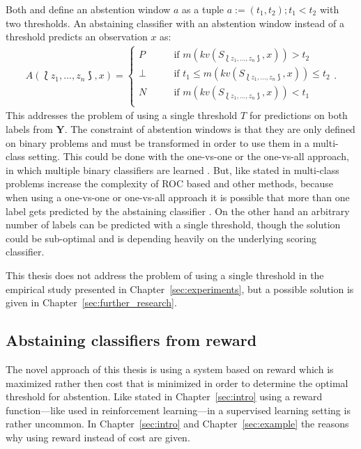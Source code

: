 \documentclass[twoside,11pt]{article}
\def\ds{\Lbag z_1,\dots,z_n \Rbag}
\def\Y{\textbf{Y}}
\begin{document}
Both \citet{friedel_et_al_2006} and \citet{guan_et_al_2018}
define an abstention window $a$ as a tuple
$a := (t_1, t_2); t_1 < t_2$ with two thresholds.
An abstaining classifier with an abstention window
instead of a threshold predicts an observation $x$ as:
\begin{align*}
  A(\ds, x) =
    \begin{cases}
      P    &\qquad \text{if } m(kv(S_{\ds}, x)) > t_2 \\
      \bot &\qquad \text{if }
            t_1 \leq m(kv(S_{\ds}, x)) \leq t_2 \\
      N    &\qquad \text{if } m(kv(S_{\ds}, x)) < t_1 \\
    \end{cases}.
\end{align*}
This addresses the problem of using a single threshold $T$
for predictions on both labels from $\Y$.
The constraint of abstention windows is that they are only
defined on binary problems and must be transformed in order
to use them in a multi-class setting.
This could be done with the one-vs-one or the one-vs-all
approach, in which multiple binary classifiers are learned
\citep[see e.g.][Chapter 14.5]{murphy_2012}.
But, like stated in \citet{friedel_2005} multi-class
problems increase the complexity of ROC based and other
methods, because when using a one-vs-one or one-vs-all
approach it is possible that more than one label gets
predicted by the abstaining classifier
\citep[see][]{friedel_2005}.
On the other hand an arbitrary number of labels can be
predicted with a single threshold, though the solution
could be sub-optimal and is depending heavily on the
underlying scoring classifier.

This thesis does not address the problem of using a single
threshold in the empirical
study presented in Chapter~\ref{sec:experiments}, but a
possible solution is given in
Chapter~\ref{sec:further_research}.

\subsection{Abstaining classifiers from reward}

The novel approach of this thesis is using a system based
on reward which is maximized rather then cost that is
minimized in order to determine the optimal threshold for
abstention.
Like stated in Chapter~\ref{sec:intro} using a reward
function---like used in reinforcement learning---in a
supervised learning setting is rather uncommon.
In Chapter~\ref{sec:intro} and Chapter~\ref{sec:example}
the reasons why using reward instead of cost are given.
\end{document}
